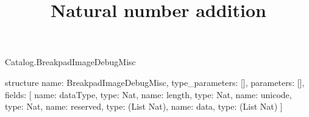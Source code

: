 \begin{lexlean}{Catalog.BreakpadImageDebugMisc}
\title{Natural number addition}
\begin{semanticmodule}
structure{
  name: BreakpadImageDebugMisc,
  type_parameters: [],
  parameters: [],
  fields: [
    {name: dataType, type: Nat},
    {name: length, type: Nat},
    {name: unicode, type: Nat},
    {name: reserved, type: (List Nat)},
    {name: data, type: (List Nat)}
  ]
}
\end{semanticmodule}
\end{lexlean}
